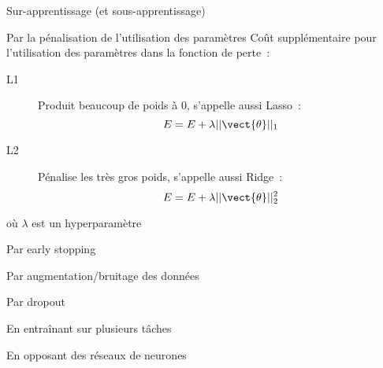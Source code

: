 \begin{frame}{Sur-apprentissage (et sous-apprentissage)}
\end{frame}

\begin{frame}{Par la pénalisation de l'utilisation des paramètres}
  Coût supplémentaire pour l'utilisation des paramètres dans la fonction de perte~:
  \begin{description}
    \item[L1] Produit beaucoup de poids à 0, s'appelle aussi Lasso~:
      \[
        E = E + \lambda ||\vect{\theta}||_1
      \]
    \item[L2] Pénalise les très gros poids, s'appelle aussi Ridge~:
      \[
        E = E + \lambda ||\vect{\theta}||_2^2
      \]
  \end{description}

  où $\lambda$ est un hyperparamètre
\end{frame}

\begin{frame}{Par early stopping}
\end{frame}

\begin{frame}{Par augmentation/bruitage des données}
\end{frame}

\begin{frame}{Par dropout}
\end{frame}

\begin{frame}{En entraînant sur plusieurs tâches}
\end{frame}

\begin{frame}{En opposant des réseaux de neurones}
\end{frame}
